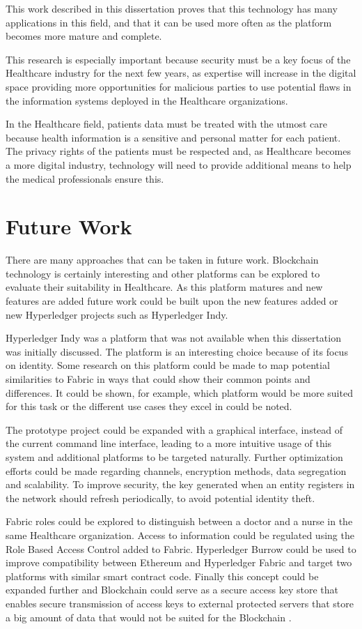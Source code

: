 This work described in this dissertation proves that this technology has many
applications in this field, and that it can be used more often as the platform
becomes more mature and complete.

This research is especially important because security must be a key focus of
the Healthcare industry for the next few years, as expertise will increase in
the digital space providing more opportunities for malicious parties to use
potential flaws in the information systems deployed in the Healthcare
organizations.

In the Healthcare field, patients data must be treated with the utmost care
because health information is a sensitive and personal matter for each patient.
The privacy rights of the patients must be respected and, as Healthcare becomes
a more digital industry, technology will need to provide additional means to
help the medical professionals ensure this.

\section{Future Work} \label{futureWork}

There are many approaches that can be taken in future work. Blockchain
technology is certainly interesting and other platforms can be explored to
evaluate their suitability in Healthcare. As this platform matures and new
features are added future work could be built upon the new features added or
new Hyperledger projects such as Hyperledger Indy. 

Hyperledger Indy was a platform that was not available when this dissertation
was initially discussed. The platform is an interesting choice because of its
focus on identity. Some research on this platform could be made to map
potential similarities to Fabric in ways that could show their common points
and differences. It could be shown, for example, which platform would be more
suited for this task or the different use cases they excel in could be noted.

The prototype project could be expanded with a graphical interface, instead of
the current command line interface, leading to a more intuitive usage of this
system and additional platforms to be targeted naturally. Further optimization
efforts could be made regarding channels, encryption methods, data segregation
and scalability. To improve security, the key generated when an entity registers
in the network should refresh periodically, to avoid potential identity theft.

Fabric roles could be explored to distinguish between a doctor and a nurse in
the same Healthcare organization.  Access to information could be regulated
using the Role Based Access Control added to Fabric.  Hyperledger Burrow could
be used to improve compatibility between Ethereum and Hyperledger Fabric and
target two platforms with similar smart contract code.  Finally this concept
could be expanded further and Blockchain could serve as a secure access key
store that enables secure transmission of access keys to external protected
servers that store a big amount of data that would not be suited
for the Blockchain .
